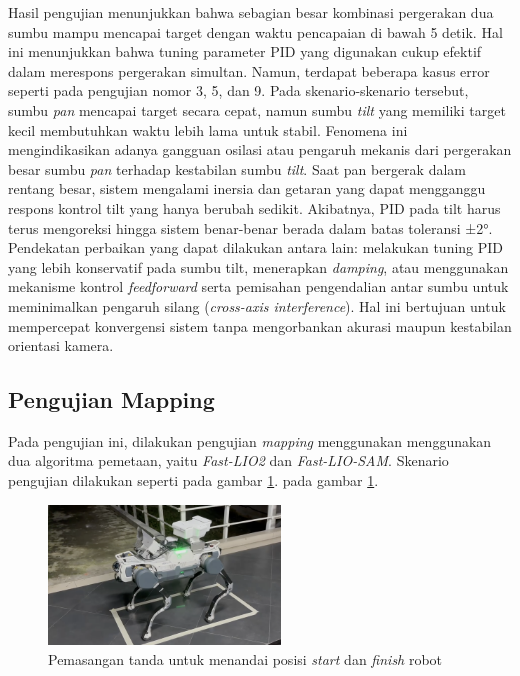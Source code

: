 Hasil pengujian menunjukkan bahwa sebagian besar kombinasi pergerakan dua sumbu mampu
mencapai target dengan waktu pencapaian di bawah 5 detik. Hal ini menunjukkan
bahwa tuning parameter PID yang digunakan cukup efektif dalam merespons
pergerakan simultan. Namun, terdapat beberapa kasus error seperti pada pengujian
nomor 3, 5, dan 9. Pada skenario-skenario tersebut, sumbu \emph{pan} mencapai
target secara cepat, namun sumbu \emph{tilt} yang memiliki target kecil
membutuhkan waktu lebih lama untuk stabil. Fenomena ini mengindikasikan adanya gangguan
osilasi atau pengaruh mekanis dari pergerakan besar sumbu \emph{pan} terhadap
kestabilan sumbu \emph{tilt}. Saat pan bergerak dalam rentang besar, sistem mengalami
inersia dan getaran yang dapat mengganggu respons kontrol tilt yang hanya berubah
sedikit. Akibatnya, PID pada tilt harus terus mengoreksi hingga sistem benar-benar
berada dalam batas toleransi ±2°. Pendekatan perbaikan yang dapat dilakukan
antara lain: melakukan tuning PID yang lebih konservatif pada sumbu tilt,
menerapkan \emph{damping}, atau menggunakan mekanisme kontrol \emph{feedforward}
serta pemisahan pengendalian antar sumbu untuk meminimalkan pengaruh silang (\emph{cross-axis
interference}). Hal ini bertujuan untuk mempercepat konvergensi sistem tanpa mengorbankan
akurasi maupun kestabilan orientasi kamera.

\subsection{Pengujian Mapping}
Pada pengujian ini, dilakukan pengujian \emph{mapping} menggunakan menggunakan dua
algoritma pemetaan, yaitu \emph{Fast-LIO2} dan \emph{Fast-LIO-SAM}.  Skenario pengujian dilakukan seperti pada gambar \ref{fig:loop_closure}.
pada gambar \ref{fig:loop_closure}.
\begin{figure}[H]
	\centering
	\includegraphics[width=0.55\textwidth]{gambar/tanda.png}
	\caption{Pemasangan tanda untuk menandai posisi \emph{start} dan \emph{finish}
	robot}
	\label{fig:loop_closure}
\end{figure}


